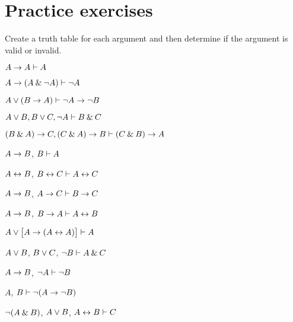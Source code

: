 




\section{Practice exercises}
\setcounter{ProbPart}{0}

\problempart
\label{pr.TT.valid}
Create a truth table for each argument and then determine if the argument is valid or invalid.
\begin{earg}
\item $A\rightarrow A \vdash A$\vspace{.5ex} %
\item $A\rightarrow(A\mathbin{\&}{\neg} A) \vdash {\neg} A$\vspace{.5ex} %
\item $A\vee(B\rightarrow A) \vdash {\neg} A \rightarrow {\neg} B$\vspace{.5ex} %
\item $A\vee B, B\vee C, {\neg} A \vdash B \mathbin{\&} C$\vspace{.5ex} %
\item $(B\mathbin{\&} A)\rightarrow C, (C\mathbin{\&} A)\rightarrow B \vdash (C\mathbin{\&} B)\rightarrow A$\vspace{.5ex} %


\item $A\rightarrow B$, $B \vdash  A$\vspace{.5ex} %
\item $A\leftrightarrow B$, $B\leftrightarrow C \vdash A\leftrightarrow C$\vspace{.5ex} %
\item $A \rightarrow B$, $A \rightarrow C\vdash B \rightarrow C$\vspace{.5ex} %
\item $A \rightarrow B$, $B \rightarrow A\vdash A \leftrightarrow B$\vspace{.5ex} %


\item $A\vee\bigl[A\rightarrow(A\leftrightarrow A)\bigr] \vdash  A $\vspace{.5ex}%
\item $A\vee B$, $B\vee C$, ${\neg} B \vdash A \mathbin{\&} C$\vspace{.5ex} %
\item $A \rightarrow B$, ${\neg} A\vdash {\neg} B$ \vspace{.5ex}%
\item $A$, $B\vdash {\neg}(A\rightarrow {\neg} B)$ \vspace{.5ex}%
\item ${\neg}(A \mathbin{\&} B)$, $A \vee B$, $A \leftrightarrow B\vdash C$ \vspace{.5ex}%
\end{earg}


